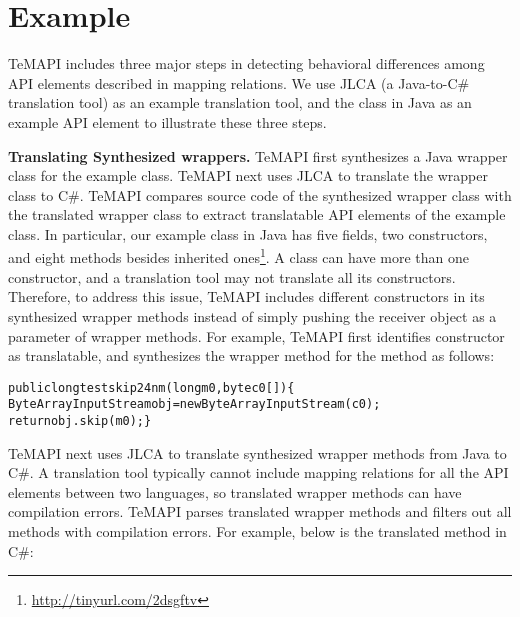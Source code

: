 \section{Example}
\label{sec:example}

TeMAPI includes three major steps in detecting behavioral differences among API elements described in mapping relations. We use JLCA (a Java-to-C\# translation tool) as an example translation tool, and the  class in Java as an example API element to illustrate these three steps.

\textbf{Translating Synthesized wrappers.} TeMAPI first synthesizes a Java wrapper class for the example class. TeMAPI next uses JLCA to translate the wrapper class to C\#. TeMAPI compares source code of the synthesized wrapper class with the translated wrapper class to extract translatable API elements of the example class. In particular, our example class in Java has five fields, two constructors, and eight methods besides inherited ones\footnote{\url{http://tinyurl.com/2dsgftv}}. A class can have more than one constructor, and a translation tool may not translate all its constructors. Therefore, to address this issue, TeMAPI includes different constructors in its synthesized wrapper methods instead of simply pushing the receiver object as a parameter of wrapper methods. For example, TeMAPI first identifies  constructor as translatable, and synthesizes the wrapper method for the  method as follows:

\begin{CodeOut}\vspace*{-1.5ex}
\begin{alltt}
public long testskip24nm(long m0, byte c0[])\{
  ByteArrayInputStream obj = new ByteArrayInputStream(c0);
  return obj.skip(m0);\}
\end{alltt}
\end{CodeOut}\vspace*{-2ex}

TeMAPI next uses JLCA to translate synthesized wrapper methods from Java to C\#. A translation tool typically cannot include mapping relations for all the API elements between two languages, so translated wrapper methods can have compilation errors. TeMAPI parses translated wrapper methods and filters out all methods with compilation errors. For example, below is the translated  method in C\#:

